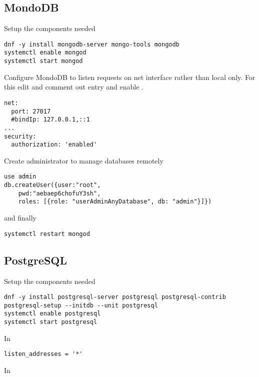 \subsection{MondoDB}
\label{subsec:setup-mware-mondodb}

Setup the components needed

\begin{lstlisting}
dnf -y install mongodb-server mongo-tools mongodb
systemctl enable mongod
systemctl start mongod
\end{lstlisting}

Configure MondoDB to listen requests on net interface rather
than local only. For this edit  and
comment out  entry and enable .

\begin{lstlisting}
net:
  port: 27017
  #bindIp: 127.0.0.1,::1
...
security:
  authorization: 'enabled'
\end{lstlisting}

Create administrator to manage databases remotely

\begin{lstlisting}
use admin
db.createUser({user:"root",
	pwd:"aebaep6chofuY3sh",
	roles: [{role: "userAdminAnyDatabase", db: "admin"}]})
\end{lstlisting}

and finally

\begin{lstlisting}
systemctl restart mongod
\end{lstlisting}

\subsection{PostgreSQL}
\label{subsec:setup-mware-postgresql}

Setup the components needed

\begin{lstlisting}
dnf -y install postgresql-server postgresql postgresql-contrib
postgresql-setup --initdb --unit postgresql
systemctl enable postgresql
systemctl start postgresql
\end{lstlisting}

In 

\begin{lstlisting}
listen_addresses = '*'
\end{lstlisting}

In 

